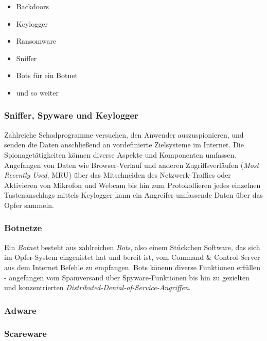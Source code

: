 \begin{multicols}{2}
	\begin{itemize}
		\item Backdoors
		\item Keylogger
		\item Ransomware
		\item Sniffer
		\item Bots für ein Botnet
		\item und so weiter
	\end{itemize}
\end{multicols}

\subsubsection{Sniffer, Spyware und Keylogger}
\label{sec:SnifferSpywareKeylogger}

Zahlreiche Schadprogramme versuchen, den Anwender auszuspionieren, und senden die Daten anschließend an vordefinierte Zielsysteme im Internet. Die Spionagetätigkeiten können diverse Aspekte und Komponenten umfassen. Angefangen von Daten wie Browser-Verlauf und anderen Zugriffsverläufen (\textit{Most Recently Used}, MRU) über das Mitschneiden des Netzwerk-Traffics oder Aktivieren von Mikrofon und Webcam bis hin zum Protokollieren jedes einzelnen Tastenanschlags mittels Keylogger kann ein Angreifer umfassende Daten über das Opfer sammeln.

\subsubsection{Botnetze}
\label{sec:Botnetze}

Ein \textit{Botnet} besteht aus zahlreichen \textit{Bots}, also einem Stückchen Software, das sich im Opfer-System eingenistet hat und bereit ist, vom Command \& Control-Server aus dem Internet Befehle zu empfangen. Bots könenn diverse Funktionen erfüllen - angefangen vom Spamversand über Spyware-Funktionen bis hin zu gezielten und konzentrierten \textit{Distributed-Denial-of-Service-Angriffen}.

\subsubsection{Adware}
\label{sec:Adware}


\subsubsection{Scareware}
\label{sec:Scareware}

